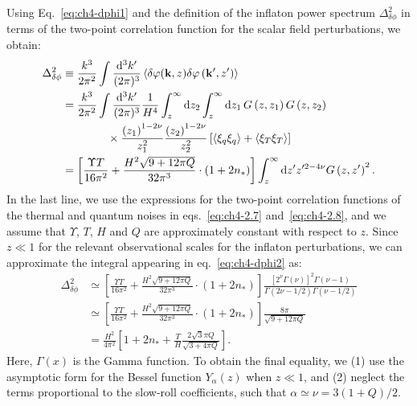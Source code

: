 Using Eq.~\eqref{eq:ch4-dphi1} and the definition of the inflaton power spectrum $\Delta^2_{\delta\phi}$ in terms of the two-point correlation function for the scalar field perturbations, we obtain:
\begin{align}
    \Delta^2_{\delta\phi}&\equiv \frac{k^3}{2 \pi^2} \int \frac{{\rm d}^3 k^{\prime}}{(2 \pi)^3}\left\langle\delta \varphi(\mathbf{k}, z) \delta \varphi\left(\mathbf{k}^{\prime}, z^\prime\right)\right\rangle \\
    &=\frac{k^3}{2 \pi^2} \int \frac{{\rm d}^3 k^{\prime}}{(2 \pi)^3} \frac{1}{H^4} \int_z^{\infty} {\rm d} z_2 \int_z^{\infty} {\rm d} z_1\, G\left(z, z_1\right) G\left(z, z_2\right) \nonumber \\
    &\qquad\qquad \times \frac{\left(z_1\right)^{1-2 \nu}}{z_1^2} \frac{\left(z_2\right)^{1-2 \nu}}{z_2^2}\left[\left\langle\xi_q \xi_q\right\rangle +\left\langle\xi_T\xi_T\right\rangle \right] \nonumber \\
    &=\left[\frac{\Upsilon T}{16\pi^2}+\frac{H^2\sqrt{9+12\pi Q}}{ 32\pi^3}\cdot(1+2n_{*}) \right]\int_z^{\infty} {\rm d} z^{\prime} z^{\prime 2-4 \nu} G\left(z, z^{\prime}\right)^2. \label{eq:ch4-dphi2}
\end{align}
In the last line, we use the expressions for the two-point correlation functions of the thermal and quantum noises in eqs.~\eqref{eq:ch4-2.7} and~\eqref{eq:ch4-2.8}, and we assume that $\Upsilon$, $T$, $H$ and $Q$ are approximately constant with respect to $z$. Since $z\ll 1$ for the relevant observational scales for the inflaton perturbations, we can approximate the integral
appearing in eq.~\eqref{eq:ch4-dphi2} as:
\begin{align}
     \Delta^2_{\delta\phi}&\simeq\left[\frac{\Upsilon T}{16\pi^2}+\frac{H^2\sqrt{9+12\pi Q}}{ 32\pi^3}\cdot(1+2n_{\mathrm{*}}) \right] \frac{\left[2^\nu \Gamma(\nu)\right]^2 \Gamma(\nu-1)}{\Gamma(2 \nu-1 / 2) \Gamma(\nu-1 / 2)} \label{eq:ch4-gamma_expression} \\
 &\simeq \left[\frac{\Upsilon T}{16\pi^2}+\frac{H^2\sqrt{9+12\pi Q}}{ 32\pi^3}\cdot(1+2n_{\mathrm{*}}) \right]\frac{8\pi}{\sqrt{9+12\pi Q}} \\
 &=\frac{H^2}{4\pi^2}\left[1+2n_{\mathrm{*}}+\frac{T}{H}\frac{2\sqrt{3}\pi Q}{\sqrt{3+4\pi Q}} \right].
\end{align}
Here, $\Gamma(x)$ is the Gamma function. To obtain the final equality, we (1) use the asymptotic form for the Bessel function $Y_\alpha(z)$ when $z\ll 1$, and (2) neglect the terms proportional to the slow-roll coefficients, such that $\alpha\simeq \nu =3(1+Q)/2$.  

